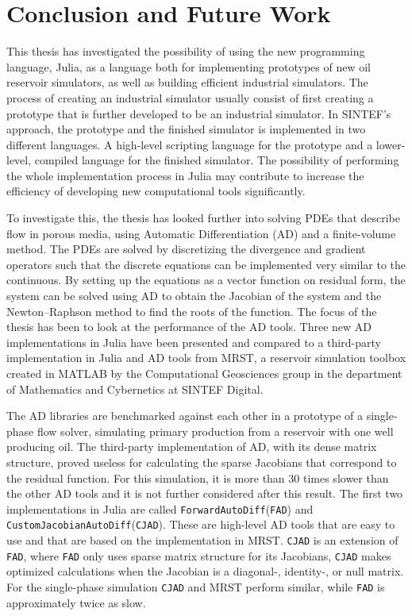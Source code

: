 \chapter{Conclusion and Future Work}
\label{ch:Conclusion}
This thesis has investigated the possibility of using the new programming language, Julia, as a language both for implementing prototypes of new oil reservoir simulators, as well as building efficient industrial simulators. The process of creating an industrial simulator usually consist of first creating a prototype that is further developed to be an industrial simulator. In SINTEF's approach, the prototype and the finished simulator is implemented in two different languages. A high-level scripting language for the prototype and a lower-level, compiled language for the finished simulator. The possibility of performing the whole implementation process in Julia may contribute to increase the efficiency of developing new computational tools significantly.

To investigate this, the thesis has looked further into solving PDEs that describe flow in porous media, using Automatic Differentiation (AD) and a finite-volume method. The PDEs are solved by discretizing the divergence and gradient operators such that the discrete equations can be implemented very similar to the continuous. By setting up the equations as a vector function on residual form, the system can be solved using AD to obtain the Jacobian of the system and the Newton--Raphson method to find the roots of the function. The focus of the thesis has been to look at the performance of the AD tools. Three new AD implementations in Julia have been presented and compared to a third-party implementation in Julia and AD tools from MRST, a reservoir simulation toolbox created in MATLAB by the Computational Geosciences group in the department of Mathematics and Cybernetics at SINTEF Digital\emph{\citep{mrstHomepage}}. 

The AD libraries are benchmarked against each other in a prototype of a single-phase flow solver, simulating primary production from a reservoir with one well producing oil. The third-party implementation of AD, with its dense matrix structure, proved useless for calculating the sparse Jacobians that correspond to the residual function. For this simulation, it is more than 30 times slower than the other AD tools and it is not further considered after this result. The first two implementations in Julia are called \texttt{ForwardAutoDiff}(\texttt{FAD}) and \texttt{CustomJacobianAutoDiff}(\texttt{CJAD}). These are high-level AD tools that are easy to use and that are based on the implementation in MRST. \texttt{CJAD} is an extension of \texttt{FAD}, where \texttt{FAD} only uses sparse matrix structure for its Jacobians, \texttt{CJAD} makes optimized calculations when the Jacobian is a diagonal-, identity-, or null matrix. For the single-phase simulation \texttt{CJAD} and MRST perform similar, while \texttt{FAD} is approximately twice as slow. 

